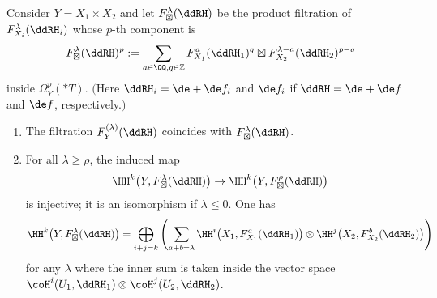 \begin{lemma*} Consider $Y = X_1\times X_2$ and let $F_\boxtimes^\lambda(\ddRH)$ be the product filtration of $F_{X_i}^\lambda(\ddRH_i)$ whose $p$-th component is
\begin{gather*} F_\boxtimes^\lambda(\ddRH)^p := \sum_{a\in\QQ, q\in\mathbb{Z}} 	F_{X_1}^a(\ddRH_1)^q \boxtimes F_{X_2}^{\lambda-a}(\ddRH_2)^{p-q} \end{gather*}
inside $\Omega_Y^p(*T)$. $($Here $\ddRH_i = \de+\de f_i$ and $\de f_i$ if $\ddRH = \de+\de f$ and $\de f$, respectively.$)$
\begin{enumerate}\itemsep=0pt
\item The filtration $F_Y^{(\lambda)}(\ddRH)$ coincides with $F_\boxtimes^\lambda(\ddRH)$.
\item For all $\lambda \geq \rho$, the induced map
\begin{gather*} \HH^k\big(Y,F_\boxtimes^\lambda(\ddRH)\big) \to \HH^k\big(Y,F_\boxtimes^\rho(\ddRH)\big) \end{gather*}
is injective; it is an isomorphism if $\lambda\leq 0$. One has
\begin{gather}\label{eq:Kunneth-Y1}
\HH^k\big(Y, F_\boxtimes^\lambda(\ddRH)\big) = \bigoplus_{i+j=k}\left(\sum_{a +b = \lambda} \HH^i\big(X_1,F_{X_1}^a(\ddRH_1)\big)\otimes\HH^j\big(X_2,F^b_{X_2}(\ddRH_2)\big) \right)
\end{gather}
for any $\lambda$ where the inner sum is taken inside the vector space $\coH^i(U_1,\ddRH_1)\otimes \coH^j(U_2,\ddRH_2)$.
\end{enumerate}
\end{lemma*}

